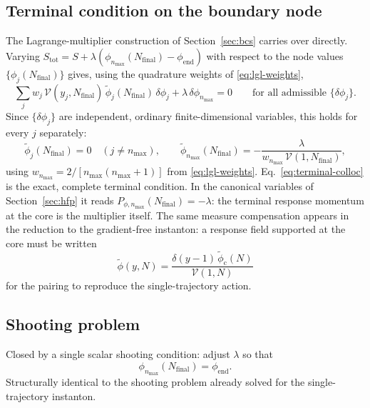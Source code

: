 \documentclass[a4paper,11pt]{article}
\newcommand{\Ny}{N}                          %
\newcommand{\Nfinal}{N_{\mathrm{final}}}     %
\newcommand{\field}{\phi}                    %
\newcommand{\phiend}{\field_{\mathrm{end}}}
\newcommand{\rfield}{\widetilde\field}       %
\newcommand{\yco}{y}                         %
\newcommand{\modeidx}{n}                     %
\newcommand{\volel}{\mathcal{V}}             %
\newcommand{\core}{\mathrm{c}}                %
\newcommand{\lag}{\lambda}                   %
\begin{document}
\subsection{Terminal condition on the boundary node}
\label{sec:terminal-collocation}

The Lagrange-multiplier construction of Section~\ref{sec:bcs} carries
over directly. Varying $S_{\mathrm{tot}}=S+\lag(\field_{\modeidx_{\max}}(\Nfinal)-\phiend)$
with respect to the node values $\{\field_j(\Nfinal)\}$ gives, using the
quadrature weights of \eqref{eq:lgl-weights},
\begin{equation}
    \sum_j w_j\,\volel(\yco_j,\Nfinal)\,\rfield_j(\Nfinal)\,\delta\field_j
    + \lag\,\delta\field_{\modeidx_{\max}}
    = 0
    \qquad \text{for all admissible } \{\delta\field_j\} .
\end{equation}
Since $\{\delta\field_j\}$ are independent, ordinary finite-dimensional
variables, this holds for every $j$ separately:
\begin{equation}
    \rfield_j(\Nfinal) = 0 \quad (j\neq\modeidx_{\max}) ,
    \qquad
    \rfield_{\modeidx_{\max}}(\Nfinal) = -\frac{\lag}{w_{\modeidx_{\max}}\,\volel(1,\Nfinal)} ,
    \label{eq:terminal-colloc}
\end{equation}
using $w_{\modeidx_{\max}}=2/[\modeidx_{\max}(\modeidx_{\max}+1)]$ from
\eqref{eq:lgl-weights}. Eq.~\eqref{eq:terminal-colloc} is the exact,
complete terminal condition. In the canonical variables of
Section~\ref{sec:hfp} it reads $P_{\field,\modeidx_{\max}}(\Nfinal)=-\lag$:
the terminal response momentum at the core is the multiplier itself. The same measure compensation appears in the
reduction to the gradient-free instanton: a response field supported at
the core must be written
\begin{equation}
    \rfield(\yco,\Ny)=\frac{\delta(\yco-1)\,\rfield_\core(\Ny)}{\volel(1,\Ny)}
    \label{eq:compensated-delta}
\end{equation}
for the pairing to reproduce the single-trajectory action.

\subsection{Shooting problem}
\label{sec:shooting}

Closed by a single scalar shooting condition: adjust $\lag$ so that
\begin{equation}
    \field_{\modeidx_{\max}}(\Nfinal) = \phiend .
\end{equation}
Structurally identical to the shooting problem already solved for the
single-trajectory instanton.
\end{document}
